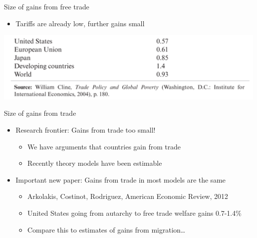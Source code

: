 \documentclass{beamer}
\begin{document}
\begin{frame}{Size of gains from free trade}
    \begin{itemize}
        \item Tariffs are already low, further gains small
    \end{itemize}
    \includegraphics[scale=0.25]{trade_gains.png}
\end{frame}

\begin{frame}{Size of gains from trade}
    \begin{itemize}
        \item Research frontier: Gains from trade too small!
        \begin{itemize}
            \item We have arguments that countries gain from trade
            \item Recently theory models have been estimable
        \end{itemize}
        \item Important new paper: Gains from trade in most models are the same
        \begin{itemize}
            \item Arkolakis, Costinot, Rodriguez, American Economic Review, 2012
            \item United States going from autarchy to free trade welfare gains 0.7-1.4\% 
            \item Compare this to estimates of gains from migration\dots
        \end{itemize}
    \end{itemize}
\end{frame}
\end{document}
